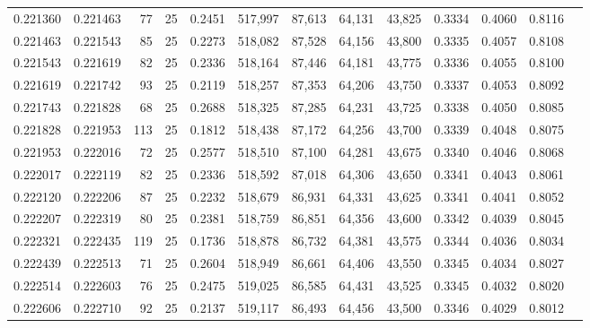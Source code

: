 \begin{tabular}{rrrrrrrrrrrrr}
0.221360 & 0.221463 &    77 &  25 &                                     0.2451 & 517,997 &  87,613 &  64,131 &  43,825 & 0.3334 & 0.4060 & 0.8116 \\
0.221463 & 0.221543 &    85 &  25 &                                     0.2273 & 518,082 &  87,528 &  64,156 &  43,800 & 0.3335 & 0.4057 & 0.8108 \\
0.221543 & 0.221619 &    82 &  25 &                                     0.2336 & 518,164 &  87,446 &  64,181 &  43,775 & 0.3336 & 0.4055 & 0.8100 \\
0.221619 & 0.221742 &    93 &  25 &                                     0.2119 & 518,257 &  87,353 &  64,206 &  43,750 & 0.3337 & 0.4053 & 0.8092 \\
0.221743 & 0.221828 &    68 &  25 &                                     0.2688 & 518,325 &  87,285 &  64,231 &  43,725 & 0.3338 & 0.4050 & 0.8085 \\
0.221828 & 0.221953 &   113 &  25 &                                     0.1812 & 518,438 &  87,172 &  64,256 &  43,700 & 0.3339 & 0.4048 & 0.8075 \\
0.221953 & 0.222016 &    72 &  25 &                                     0.2577 & 518,510 &  87,100 &  64,281 &  43,675 & 0.3340 & 0.4046 & 0.8068 \\
0.222017 & 0.222119 &    82 &  25 &                                     0.2336 & 518,592 &  87,018 &  64,306 &  43,650 & 0.3341 & 0.4043 & 0.8061 \\
0.222120 & 0.222206 &    87 &  25 &                                     0.2232 & 518,679 &  86,931 &  64,331 &  43,625 & 0.3341 & 0.4041 & 0.8052 \\
0.222207 & 0.222319 &    80 &  25 &                                     0.2381 & 518,759 &  86,851 &  64,356 &  43,600 & 0.3342 & 0.4039 & 0.8045 \\
0.222321 & 0.222435 &   119 &  25 &                                     0.1736 & 518,878 &  86,732 &  64,381 &  43,575 & 0.3344 & 0.4036 & 0.8034 \\
0.222439 & 0.222513 &    71 &  25 &                                     0.2604 & 518,949 &  86,661 &  64,406 &  43,550 & 0.3345 & 0.4034 & 0.8027 \\
0.222514 & 0.222603 &    76 &  25 &                                     0.2475 & 519,025 &  86,585 &  64,431 &  43,525 & 0.3345 & 0.4032 & 0.8020 \\
0.222606 & 0.222710 &    92 &  25 &                                     0.2137 & 519,117 &  86,493 &  64,456 &  43,500 & 0.3346 & 0.4029 & 0.8012 \\

\end{tabular}
